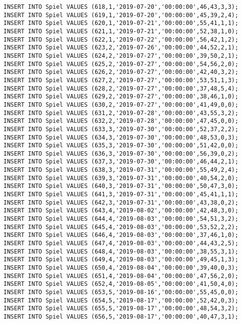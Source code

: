\documentclass{bschlangaul-aufgabe}
\begin{document}
\begin{verbatim}
INSERT INTO Spiel VALUES (618,1,'2019-07-20','00:00:00',46,43,3,3);
INSERT INTO Spiel VALUES (619,1,'2019-07-20','00:00:00',45,39,2,4);
INSERT INTO Spiel VALUES (620,1,'2019-07-21','00:00:00',55,41,1,1);
INSERT INTO Spiel VALUES (621,1,'2019-07-21','00:00:00',52,38,1,0);
INSERT INTO Spiel VALUES (622,1,'2019-07-22','00:00:00',56,42,1,2);
INSERT INTO Spiel VALUES (623,2,'2019-07-26','00:00:00',44,52,2,1);
INSERT INTO Spiel VALUES (624,2,'2019-07-27','00:00:00',39,50,2,1);
INSERT INTO Spiel VALUES (625,2,'2019-07-27','00:00:00',54,56,2,0);
INSERT INTO Spiel VALUES (626,2,'2019-07-27','00:00:00',42,40,3,2);
INSERT INTO Spiel VALUES (627,2,'2019-07-27','00:00:00',53,51,1,3);
INSERT INTO Spiel VALUES (628,2,'2019-07-27','00:00:00',37,48,5,4);
INSERT INTO Spiel VALUES (629,2,'2019-07-27','00:00:00',38,46,1,0);
INSERT INTO Spiel VALUES (630,2,'2019-07-27','00:00:00',41,49,0,0);
INSERT INTO Spiel VALUES (631,2,'2019-07-28','00:00:00',43,55,3,2);
INSERT INTO Spiel VALUES (632,2,'2019-07-28','00:00:00',47,45,0,0);
INSERT INTO Spiel VALUES (633,3,'2019-07-30','00:00:00',52,37,2,2);
INSERT INTO Spiel VALUES (634,3,'2019-07-30','00:00:00',48,53,0,3);
INSERT INTO Spiel VALUES (635,3,'2019-07-30','00:00:00',51,42,0,0);
INSERT INTO Spiel VALUES (636,3,'2019-07-30','00:00:00',56,39,0,2);
INSERT INTO Spiel VALUES (637,3,'2019-07-30','00:00:00',46,44,2,1);
INSERT INTO Spiel VALUES (638,3,'2019-07-31','00:00:00',55,49,2,4);
INSERT INTO Spiel VALUES (639,3,'2019-07-31','00:00:00',40,54,2,0);
INSERT INTO Spiel VALUES (640,3,'2019-07-31','00:00:00',50,47,3,0);
INSERT INTO Spiel VALUES (641,3,'2019-07-31','00:00:00',45,41,1,1);
INSERT INTO Spiel VALUES (642,3,'2019-07-31','00:00:00',43,38,0,2);
INSERT INTO Spiel VALUES (643,4,'2019-08-02','00:00:00',42,48,3,0);
INSERT INTO Spiel VALUES (644,4,'2019-08-03','00:00:00',54,51,3,2);
INSERT INTO Spiel VALUES (645,4,'2019-08-03','00:00:00',53,52,2,2);
INSERT INTO Spiel VALUES (646,4,'2019-08-03','00:00:00',37,46,1,0);
INSERT INTO Spiel VALUES (647,4,'2019-08-03','00:00:00',44,43,2,5);
INSERT INTO Spiel VALUES (648,4,'2019-08-03','00:00:00',38,55,3,1);
INSERT INTO Spiel VALUES (649,4,'2019-08-03','00:00:00',49,45,1,3);
INSERT INTO Spiel VALUES (650,4,'2019-08-04','00:00:00',39,40,0,3);
INSERT INTO Spiel VALUES (651,4,'2019-08-04','00:00:00',47,56,2,0);
INSERT INTO Spiel VALUES (652,4,'2019-08-05','00:00:00',41,50,4,0);
INSERT INTO Spiel VALUES (653,5,'2019-08-16','00:00:00',55,45,0,0);
INSERT INTO Spiel VALUES (654,5,'2019-08-17','00:00:00',52,42,0,3);
INSERT INTO Spiel VALUES (655,5,'2019-08-17','00:00:00',48,54,3,2);
INSERT INTO Spiel VALUES (656,5,'2019-08-17','00:00:00',40,47,3,1);

\end{verbatim}
\end{document}
